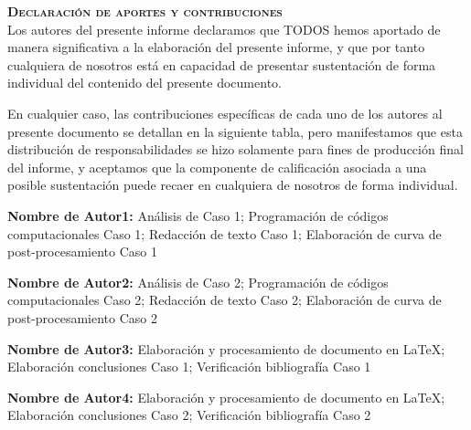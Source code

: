 \documentclass[11pt,stdletter,orderfromtodate,sigleft,twoside]{report}
\begin{document}

\thispagestyle{declarationstyle}
\vspace*{12mm}
\begin{framed}
    {\Large \textbf{\textsc{Declaración de aportes y contribuciones}}}\\[8mm]

Los autores del presente informe declaramos que TODOS hemos aportado de manera
significativa a la elaboración del presente informe, y que por tanto cualquiera
de nosotros está en capacidad de presentar sustentación de forma individual del
contenido del presente documento.

En cualquier caso, las contribuciones específicas de cada uno de los autores al
presente documento se detallan en la siguiente tabla, pero manifestamos que
esta distribución de responsabilidades se hizo solamente para fines de
producción final del informe, y aceptamos que la componente de calificación
asociada a una posible sustentación puede recaer en cualquiera de nosotros de
forma individual.

\end{framed}

\vfill

\begin{framed}
    {\large \textbf{Nombre de Autor1:} An\'alisis de Caso 1; Programaci\'on de c\'odigos computacionales Caso 1; Redacci\'on de texto Caso 1; Elaboraci\'on de curva de post-procesamiento Caso 1}\\[2mm]
\end{framed}
\begin{framed}
    {\large \textbf{Nombre de Autor2:} An\'alisis de Caso 2; Programaci\'on de c\'odigos computacionales Caso 2; Redacci\'on de texto Caso 2; Elaboraci\'on de curva de post-procesamiento Caso 2}\\[2mm]
\end{framed}
\begin{framed}
    {\large \textbf{Nombre de Autor3:} Elaboraci\'on y procesamiento de documento en \LaTeX ; Elaboraci\'on conclusiones Caso 1; Verificaci\'on bibliograf\'ia Caso 1}\\[2mm]
\end{framed}
\begin{framed}
    {\large \textbf{Nombre de Autor4:} Elaboraci\'on y procesamiento de documento en \LaTeX ; Elaboraci\'on conclusiones Caso 2; Verificaci\'on bibliograf\'ia Caso 2}\\[2mm]
\end{framed}
\end{document}
